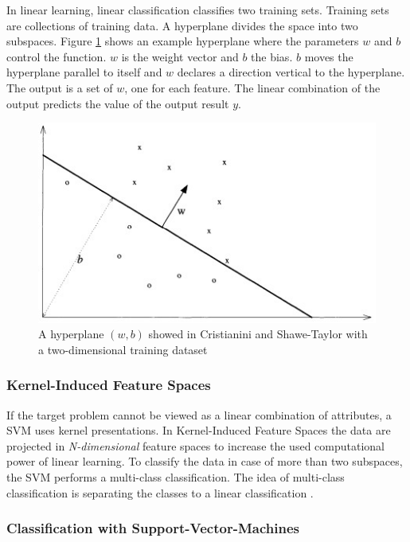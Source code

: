 In linear learning, linear classification classifies two training sets. Training sets are collections of training data. A hyperplane divides the space into two subspaces.
\cite{cristianini_shawe-taylor_2000} Figure \ref{fig:hyperplane} shows an example hyperplane where the parameters $w$ and $b$ control the function. $w$ is the weight vector and $b$ the
bias. $b$ moves the hyperplane parallel to itself and $w$ declares a direction vertical to the hyperplane. The output is a set of $w$, one for each feature. The linear combination of the
output predicts the value of the output result $y$.

\begin{figure}[ht!]
  \centering
  \includegraphics[width=12cm]{pictures/hyperplane.jpg}
  \caption{A hyperplane $(w, b)$ showed in Cristianini and Shawe-Taylor \cite{cristianini_shawe-taylor_2000} with a two-dimensional training dataset}
  \label{fig:hyperplane}
\end{figure}

\subsubsection*{Kernel-Induced Feature Spaces}

If the target problem cannot be viewed as a linear combination of attributes, a SVM uses kernel presentations. In Kernel-Induced Feature Spaces the data are projected in
\textit{N-dimensional} feature spaces to increase the used computational power of linear learning. To classify the data in case of more than two subspaces, the SVM performs a multi-class
classification. The idea of multi-class classification is separating the classes to a linear classification \cite{tzotsos2008support}.

\subsubsection*{Classification with Support-Vector-Machines}


